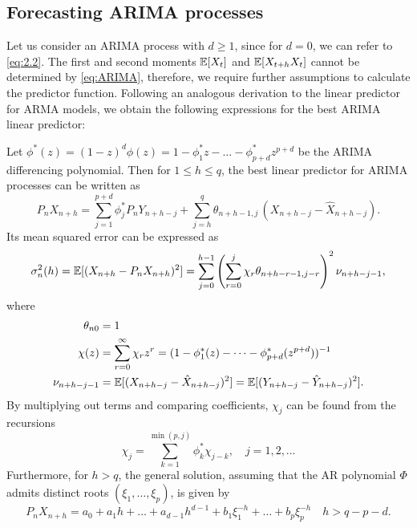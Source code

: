 \documentclass[a4paper, oneside]{discothesis}
\begin{document}
\subsection{Forecasting ARIMA processes}
Let us consider an ARIMA process with $d \geq 1$, since for $d=0$, we can refer to \eqref{eq:2.2}. The first and second moments $\operatorname{\mathbb{E}}[X_t]$ and $\operatorname{\mathbb{E}}[X_{t+h}X_t]$ cannot be determined by \eqref{eq:ARIMA}, therefore, we require further assumptions to calculate the predictor function. Following an analogous derivation to the linear predictor for ARMA models, we obtain the following expressions for the best ARIMA linear predictor:
\newpage
\begin{theorem}\label{thm:ArimaPred}
    Let $\phi^*(z) = (1-z)^d \phi(z) = 1 - \phi_1^* z - \dots - \phi_{p+d}^* z^{p+d}$ be the ARIMA differencing polynomial. Then for $1 \leq h \leq q$, the best linear predictor for ARIMA processes can be written as
    \begin{equation} \label{eq:hsteppredARIMA}
     P_n X_{n+h} = \sum_{j=1}^{p+d} \phi_j^* P_n Y_{n+h-j} + \sum_{j = h}^q \theta_{n+h-1,j} \, (X_{n+h-j} - \hat{X}_{n+h-j}).
    \end{equation}
    Its mean squared error can be expressed as
    \begin{equation*}
    \sigma_n^2(h) = \operatorname{\mathbb{E}}[(X_{n+h} - P_n X_{n+h})^2] = \sum_{j=0}^{h-1}\left(\sum_{r=0}^j \chi_r \theta_{n+h-r-1,j-r}\right)^2 \nu_{n+h-j-1},
    \end{equation*}
    where
    \begin{align*}
        \theta_{n0} &= 1 \\
        \chi(z) &= \sum_{r=0}^\infty \chi_r z^r = (1 - \phi_1^*(z) - \dots - \phi_{p+d}^*(z^{p+d}))^{-1} \\
        \nu_{n+h-j-1} &= \operatorname{\mathbb{E}}[(X_{n+h-j} - \hat{X}_{n+h-j})^2] = \operatorname{\mathbb{E}}[(Y_{n+h-j} - \hat{Y}_{n+h-j})^2].
    \end{align*}
    By multiplying out terms and comparing coefficients, $\chi_j$ can be found from the recursions
    \begin{equation*}
        \chi_j = \sum_{k=1}^{\min(p,j)} \phi_k^* \chi_{j-k}, \quad j = 1, 2, \dots
    \end{equation*}
    Furthermore, for $h>q$, the general solution, assuming that the AR polynomial $\Phi$ admits distinct roots $(\xi_1, \dots, \xi_p)$, is given by
    \begin{equation}\label{eq:ForecastFunc}
        P_n X_{n+h} = a_0 + a_1h + \dots + a_{d-1}h^{d-1} + b_1\xi_1^{-h} + \dots + b_p \xi_p^{-h} \quad h > q - p - d.
    \end{equation}
\end{theorem}
\end{document}
